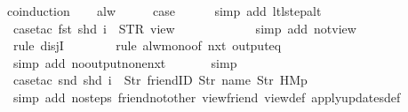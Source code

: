 \begin{isabellebody}
%
\isadelimproof
%
\endisadelimproof
%
\isatagproof
{}\isamarkupfalse%
{\isacharparenleft}coinduction{\isacharparenright}\isanewline
\ \ \isamarkupfalse%
\ alw\isanewline
\ \ \isamarkupfalse%
\ \isamarkupfalse%
\ {\isacharquery}case\isanewline
\ \ \ \ \isamarkupfalse%
\ {\isacharparenleft}simp\ add{\isacharcolon}\ ltl{\isacharunderscore}step{\isacharunderscore}alt{\isacharparenright}\isanewline
\ \ \ \ \isamarkupfalse%
\ {\isacharparenleft}case{\isacharunderscore}tac\ {\isachardoublequoteopen}{\isacharparenleft}fst\ {\isacharparenleft}shd\ i{\isacharparenright}{\isacharparenright}\ {\isacharequal}\ STR\ {\isacharprime}{\isacharprime}view{\isacharprime}{\isacharprime}{\isachardoublequoteclose}{\isacharparenright}\isanewline
\ \ \ \ \ \isamarkupfalse%
\isanewline
\ \ \ \ \ \isamarkupfalse%
\ {\isacharparenleft}simp\ add{\isacharcolon}\ not{\isacharunderscore}view{\isacharunderscore}{}{\isacharparenright}\isanewline
\ \ \ \ \ \ \isamarkupfalse%
\ {\isacharparenleft}rule\ disjI{}{\isacharparenright}\isanewline
\ \ \ \ \ \ \isamarkupfalse%
\ {\isacharparenleft}rule\ alw{\isacharunderscore}mono{\isacharbrackleft}of\ {\isachardoublequoteopen}nxt\ {\isacharparenleft}output{\isacharunderscore}eq\ {\isacharbrackleft}{\isacharbrackright}{\isacharparenright}{\isachardoublequoteclose}{\isacharbrackright}{\isacharparenright}\isanewline
\ \ \ \ \ \ \isamarkupfalse%
\ {\isacharparenleft}simp\ add{\isacharcolon}\ no{\isacharunderscore}output{\isacharunderscore}none{\isacharunderscore}nxt{\isacharparenright}\isanewline
\ \ \ \ \ \isamarkupfalse%
\ simp\isanewline
\ \ \ \ \isamarkupfalse%
\ {\isacharparenleft}case{\isacharunderscore}tac\ {\isachardoublequoteopen}{\isacharparenleft}snd\ {\isacharparenleft}shd\ i{\isacharparenright}{\isacharparenright}\ {\isacharequal}\ {\isacharbrackleft}Str\ {\isacharprime}{\isacharprime}friendID{\isacharprime}{\isacharprime}{\isacharcomma}\ Str\ {\isacharprime}{\isacharprime}name{\isacharprime}{\isacharprime}{\isacharcomma}\ Str\ {\isacharprime}{\isacharprime}HM{}p{\isacharprime}{\isacharprime}{\isacharbrackright}{\isachardoublequoteclose}{\isacharparenright}\isanewline
\ \ \ \ \ \isamarkupfalse%
\ {\isacharparenleft}simp\ add{\isacharcolon}\ no{\isacharunderscore}steps\ friend{\isacharunderscore}not{\isacharunderscore}other\ view{\isacharunderscore}friend\ view{\isacharunderscore}def\ apply{\isacharunderscore}updates{\isacharunderscore}def{\isacharparenright}\isanewline

\end{isabellebody}
